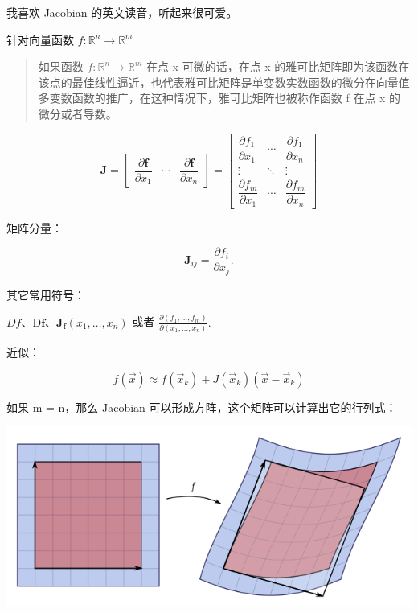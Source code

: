 \documentclass[
]{book}
\begin{document}
我喜欢 Jacobian 的英文读音，听起来很可爱。

针对向量函数 \(f: \mathbb{R}^n \to \mathbb{R}^m\)

\begin{quote}
如果函数 \(f: \mathbb{R}^n \to \mathbb{R}^m\) 在点 x 可微的话，在点 x 的雅可比矩阵即为该函数在该点的最佳线性逼近，也代表雅可比矩阵是单变数实数函数的微分在向量值多变数函数的推广，在这种情况下，雅可比矩阵也被称作函数 f 在点 x 的微分或者导数。
\end{quote}

\[
{\displaystyle \mathbf {J} ={\begin{bmatrix}{\dfrac {\partial \mathbf {f} }{\partial x_{1}}}&\cdots &{\dfrac {\partial \mathbf {f} }{\partial x_{n}}}\end{bmatrix}}={\begin{bmatrix}{\dfrac {\partial f_{1}}{\partial x_{1}}}&\cdots &{\dfrac {\partial f_{1}}{\partial x_{n}}}\\\vdots &\ddots &\vdots \\{\dfrac {\partial f_{m}}{\partial x_{1}}}&\cdots &{\dfrac {\partial f_{m}}{\partial x_{n}}}\end{bmatrix}}}
\]

矩阵分量：

\[
{\displaystyle \mathbf {J} _{ij}={\frac {\partial f_{i}}{\partial x_{j}}}.}
\]

其它常用符号：

\({\displaystyle Df}、 {\displaystyle \mathrm {D} \mathbf {f} }、{\displaystyle \mathbf {J} _{\mathbf {f} }(x_{1},\ldots ,x_{n})}\) 或者 \({\displaystyle {\frac {\partial (f_{1},\ldots ,f_{m})}{\partial (x_{1},\ldots ,x_{n})}}.}\)

近似：

\[
f(\vec{x}) \approx f(\vec{x}_k) + J(\vec{x}_k)(\vec{x} - \vec{x}_k)
\]

如果 m = n，那么 Jacobian 可以形成方阵，这个矩阵可以计算出它的行列式：

\includegraphics{images/640px-Jacobian_determinant_and_distortion.png}
\end{document}
